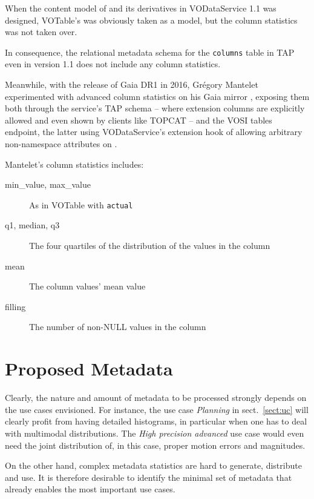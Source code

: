 \documentclass[11pt,a4paper]{ivoa}
\begin{document}
When the content model of  and its derivatives in
VODataService 1.1 \citep{2010ivoa.spec.1202P} was designed, VOTable's
 was obviously taken as a model, but the column statistics
was not taken over.

In consequence, the relational metadata schema for the
\verb|columns| table in TAP \citep{2019ivoa.spec.0927D} even in
version 1.1 does not include any column statistics.

Meanwhile, with the release of Gaia DR1 in 2016, Gr\'egory Mantelet
experimented with advanced column statistics on his Gaia mirror
\citep{data:arigaia}, exposing them both through the service's TAP
schema -- where extension columns are explicitly allowed and even shown
by clients like TOPCAT \citep{2005ASPC..347...29T} -- and the VOSI tables
endpoint, the latter using VODataService's extension hook of allowing
arbitrary non-namespace attributes on .

Mantelet's column statistics includes:

\begin{description}
\item[min\_value, max\_value] As in VOTable with  \verb|actual|
\item[q1, median, q3] The four quartiles of the distribution of the
values in the column
\item[mean] The column values' mean value
\item[filling] The number of non-NULL values in the column
\end{description}


\section{Proposed Metadata}
\label{sect:metadata}

Clearly, the nature and amount of metadata to be processed strongly
depends on the use cases envisioned.  For instance, the use case
\emph{Planning} in sect.~\ref{sect:uc} will clearly profit from having
detailed histograms, in particular when one has to deal with multimodal
distributions.  The \emph{High precision advanced} use case would even
need the joint distribution of, in this case, proper motion errors and
magnitudes.

On the other hand, complex metadata statistics are hard to generate,
distribute and use.  It is therefore desirable to identify the
minimal set of metadata that already enables the most important use
cases.
\end{document}
